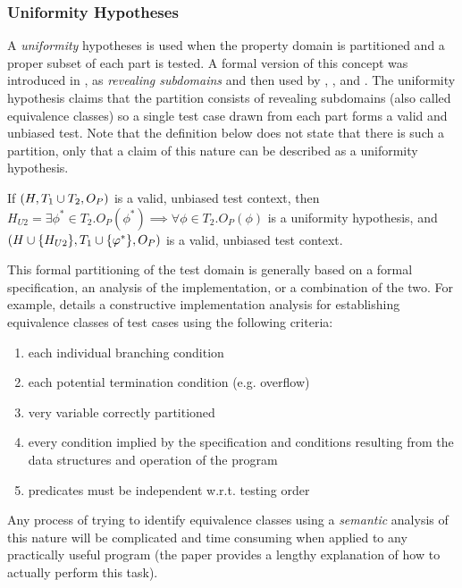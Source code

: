 \subsubsection{Uniformity Hypotheses}\label{sub:uniformity}

A \emph{uniformity} hypotheses is used when the property domain is 
partitioned and a proper subset of each part is tested.
A formal version of this concept was introduced in \cite{WeyukerOstrand1980},
as \emph{revealing subdomains}
and then used by \cite{HamletTaylor1990}, 
\cite{GoodenoughGerhart1975}, and \cite{BernotGaudelMarre1991}.
The uniformity hypothesis claims that
the partition consists of revealing subdomains (also called equivalence classes)
so a single test case drawn from each part forms a valid and unbiased test.
Note that the definition below does not state that there is such a partition,
only that a claim of this nature can be described as a uniformity hypothesis.

\begin{df}
If $(H, T_1 \cup T_2, O_P)$ is a valid, unbiased test context,
then $H_{U2} = \exists \phi^{*} \in T_2. O_P(\phi^{*}) \implies \forall \phi \in T_2. O_P(\phi)$ is a uniformity hypothesis,
and $(H \cup\{H_{U2}\}, T_1 \cup \{\varphi^{*}\}, O_P)$ is a valid, unbiased test context.
\end{df}
\noindent

This formal partitioning of the test domain is
generally based on a formal specification,
an analysis of the implementation,
or a combination of the two.
For example, \cite{BernotGaudelMarre1991} details a constructive implementation analysis for 
establishing equivalence classes of test cases using the following criteria:
\begin{enumerate}
\item each individual branching condition
\item each potential termination condition (e.g. overflow)
\item very variable correctly partitioned
\item every condition implied by the specification
and conditions resulting from the data structures and operation of the program
\item predicates must be independent w.r.t. testing order
\end{enumerate}
\noindent 
Any process of trying to identify equivalence classes using a \emph{semantic} analysis of this nature
will be complicated and time consuming when applied to any practically useful program
(the paper provides a lengthy explanation of how to actually perform this task).

